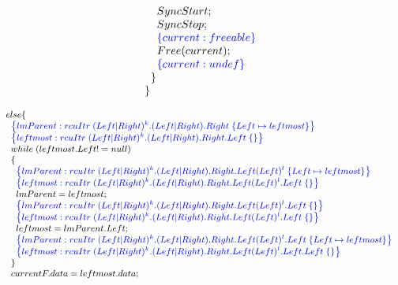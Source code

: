 \[\begin{array}{@{}l@{}}
                \;\;\;\;\;\;\;\;SyncStart;\\
                \;\;\;\;\;\;\;\;SyncStop;\\
                \;\;\;\;\;\;\;\;\specline{current:freeable}\\
                \;\;\;\;\;\;\;\;Free(current);\\
                \;\;\;\;\;\;\;\;\specline{current:undef}\\
          \;\;\;\;\;\;\}\\
        \;\;\;\;\}
        \end{array}
\]

\[\small
\begin{array}{@{}l@{}}
        \;\;\;\;else\{\\
        \;\;\;\;\;\;\specline{lmParent:rcuItr\; (Left|Right)^{k}.(Left|Right).Right \; \{ Left \mapsto leftmost\} }\\
        \;\;\;\;\;\;\specline{leftmost:rcuItr\; (Left|Right)^{k}.(Left|Right).Right.Left \; \{\} }\\
       \;\;\;\;\;\;while \;(leftmost.Left != null)\\
        \;\;\;\;\;\;\{\\
             \;\;\;\;\;\;\;\;\specline{lmParent:rcuItr\; (Left|Right)^{k}.(Left|Right).Right.Left(Left)^{l} \; \{Left \mapsto leftmost\} }\\
             \;\;\;\;\;\;\;\;\specline{leftmost:rcuItr\; (Left|Right)^{k}.(Left|Right).Right.Left(Left)^{l}.Left \; \{\} }\\
             \;\;\;\;\;\;\;\;lmParent = leftmost;\\
             \;\;\;\;\;\;\;\;\specline{lmParent:rcuItr\; (Left|Right)^{k}.(Left|Right).Right.Left(Left)^{l}.Left \; \{\} }\\
             \;\;\;\;\;\;\;\;\specline{leftmost:rcuItr\; (Left|Right)^{k}.(Left|Right).Right.Left(Left)^{l}.Left \; \{\} }\\
             \;\;\;\;\;\;\;\;leftmost = lmParent.Left;\\
             \;\;\;\;\;\;\;\;\specline{lmParent:rcuItr\; (Left|Right)^{k}.(Left|Right).Right.Left(Left)^{l}.Left \; \{Left \mapsto leftmost\} }\\
            \;\;\;\;\;\;\;\;\specline{leftmost:rcuItr\; (Left|Right)^{k}.(Left|Right).Right.Left(Left)^{l}.Left.Left \; \{\} }\\
        \;\;\;\;\;\;\}\\
        \;\;\;\;\;\;currentF.data = leftmost.data;\\

\end{array}\]
